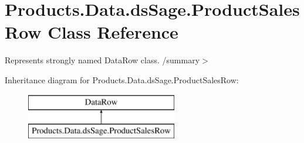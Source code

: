 \hypertarget{class_products_1_1_data_1_1ds_sage_1_1_product_sales_row}{}\section{Products.\+Data.\+ds\+Sage.\+Product\+Sales\+Row Class Reference}
\label{class_products_1_1_data_1_1ds_sage_1_1_product_sales_row}


Represents strongly named Data\+Row class. /summary$>$  


Inheritance diagram for Products.\+Data.\+ds\+Sage.\+Product\+Sales\+Row\+:\begin{figure}[H]
\begin{center}
\leavevmode
\includegraphics[height=2.000000cm]{class_products_1_1_data_1_1ds_sage_1_1_product_sales_row}
\end{center}
\end{figure}
